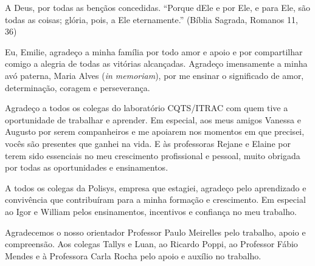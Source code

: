 \begin{agradecimentos}

A Deus, por todas as bençãos concedidas. ``Porque dEle e por Ele, e para Ele, são todas as coisas; glória, pois, a Ele eternamente.''
(Bíblia Sagrada, Romanos 11, 36)

Eu, Emilie, agradeço a minha família por todo amor e apoio e por compartilhar comigo a alegria de todas as vitórias alcançadas. 
Agradeço imensamente a minha avó paterna, Maria Alves (\textit{in memoriam}), por me ensinar o significado de amor, determinação, 
coragem e perseverança. 

Agradeço a todos os colegas do laboratório CQTS/ITRAC com quem tive a oportunidade de trabalhar e aprender. Em especial, aos meus amigos 
Vanessa e Augusto por serem companheiros e me apoiarem nos momentos em que precisei, vocês são presentes que ganhei 
na vida. E às professoras Rejane e Elaine por terem sido essenciais no meu crescimento profissional e pessoal, muito obrigada por  
todas as oportunidades e ensinamentos.

A todos os colegas da Polisys, empresa que estagiei, agradeço pelo aprendizado e convivência que contribuíram para a
minha formação e crescimento. Em especial ao Igor e William pelos ensinamentos, incentivos e confiança no meu trabalho.


Agradecemos o nosso orientador Professor Paulo Meirelles pelo trabalho, apoio e compreensão. Aos colegas Tallys e Luan, 
ao Ricardo Poppi, ao Professor Fábio Mendes e à Professora Carla Rocha pelo apoio e auxílio no trabalho.


\end{agradecimentos}
